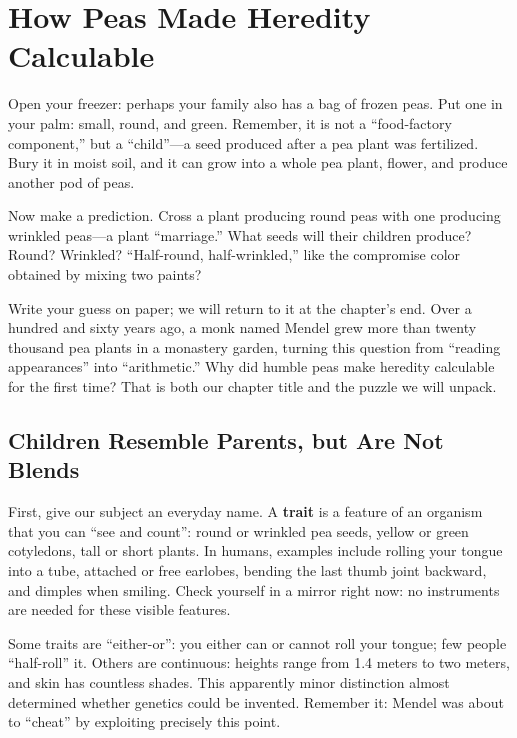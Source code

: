 \chapter{How Peas Made Heredity Calculable}

\begin{kaichang}
Open your freezer: perhaps your family also has a bag of frozen peas. Put one in your palm: small, round, and green. Remember, it is not a ``food-factory component,'' but a ``child''---a seed produced after a pea plant was fertilized. Bury it in moist soil, and it can grow into a whole pea plant, flower, and produce another pod of peas.

Now make a prediction. Cross a plant producing round peas with one producing wrinkled peas---a plant ``marriage.'' What seeds will their children produce? Round? Wrinkled? ``Half-round, half-wrinkled,'' like the compromise color obtained by mixing two paints?

Write your guess on paper; we will return to it at the chapter's end. Over a hundred and sixty years ago, a monk named Mendel grew more than twenty thousand pea plants in a monastery garden, turning this question from ``reading appearances'' into ``arithmetic.'' Why did humble peas make heredity calculable for the first time? That is both our chapter title and the puzzle we will unpack.
\end{kaichang}

\section{Children Resemble Parents, but Are Not Blends}

First, give our subject an everyday name. A \textbf{trait} is a feature of an organism that you can ``see and count'': round or wrinkled pea seeds, yellow or green cotyledons, tall or short plants. In humans, examples include rolling your tongue into a tube, attached or free earlobes, bending the last thumb joint backward, and dimples when smiling. Check yourself in a mirror right now: no instruments are needed for these visible features.

Some traits are ``either-or'': you either can or cannot roll your tongue; few people ``half-roll'' it. Others are continuous: heights range from 1.4 meters to two meters, and skin has countless shades. This apparently minor distinction almost determined whether genetics could be invented. Remember it: Mendel was about to ``cheat'' by exploiting precisely this point.

